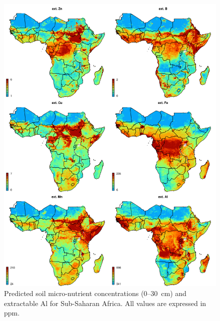 \begin{linenumbers}
\begin{figure}[!hbt]
\includegraphics[width=\textwidth]{Fig_AfNutrients_final_maps_micro.png}
\caption{Predicted soil micro-nutrient concentrations (0--\SI{30}{\centi\metre}) and extractable Al for Sub-Saharan Africa. All values are expressed in ppm.}
\label{fig:final_maps_micro}
\end{figure}

\clearpage


\end{linenumbers}
